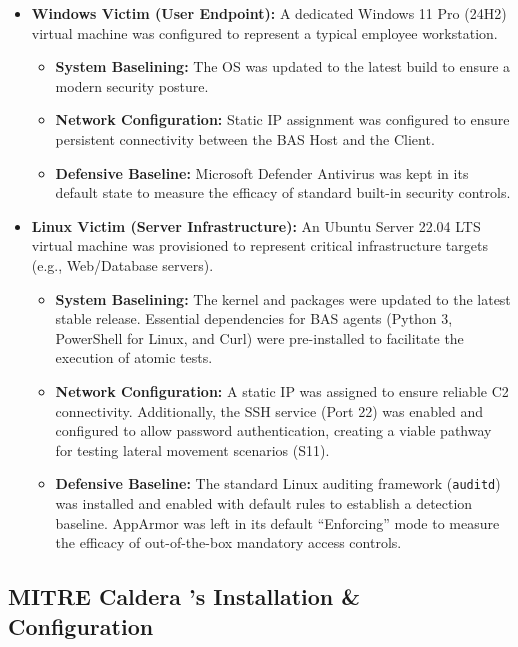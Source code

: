     \begin{itemize}
        \item \textbf {Windows Victim (User Endpoint):} A dedicated Windows 11 Pro (24H2) virtual machine was configured to represent a typical employee workstation.
        \begin{itemize}
            \item \textbf{System Baselining:} The OS was updated to the latest build to ensure a modern security posture.
            \item \textbf{Network Configuration:} Static IP assignment was configured to ensure persistent connectivity between the BAS Host and the Client.
            \item \textbf{Defensive Baseline:} Microsoft Defender Antivirus was kept in its default state to measure the efficacy of standard built-in security controls.
        \end{itemize}

        \item \textbf {Linux Victim (Server Infrastructure):} An Ubuntu Server 22.04 LTS virtual machine was provisioned to represent critical infrastructure targets (e.g., Web/Database servers).
        \begin{itemize}
            \item \textbf{System Baselining:} The kernel and packages were updated to the latest stable release. Essential dependencies for BAS agents (Python 3, PowerShell for Linux, and Curl) were pre-installed to facilitate the execution of atomic tests.
            \item \textbf{Network Configuration:} A static IP was assigned to ensure reliable C2 connectivity. Additionally, the SSH service (Port 22) was enabled and configured to allow password authentication, creating a viable pathway for testing lateral movement scenarios (S11).
            \item \textbf{Defensive Baseline:} The standard Linux auditing framework (\texttt{auditd}) was installed and enabled with default rules to establish a detection baseline. AppArmor was left in its default ``Enforcing'' mode to measure the efficacy of out-of-the-box mandatory access controls.
        \end{itemize}
    \end{itemize}


\subsection{MITRE Caldera 's Installation \& Configuration}

